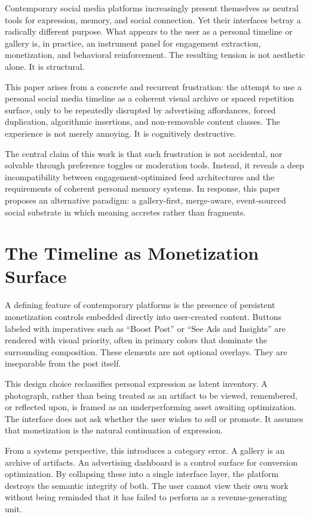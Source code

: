 \documentclass[11pt,oneside]{article}
\begin{document}
Contemporary social media platforms increasingly present themselves as neutral tools for expression, memory, and social connection. Yet their interfaces betray a radically different purpose. What appears to the user as a personal timeline or gallery is, in practice, an instrument panel for engagement extraction, monetization, and behavioral reinforcement. The resulting tension is not aesthetic alone. It is structural.

This paper arises from a concrete and recurrent frustration: the attempt to use a personal social media timeline as a coherent visual archive or spaced repetition surface, only to be repeatedly disrupted by advertising affordances, forced duplication, algorithmic insertions, and non-removable content classes. The experience is not merely annoying. It is cognitively destructive.

The central claim of this work is that such frustration is not accidental, nor solvable through preference toggles or moderation tools. Instead, it reveals a deep incompatibility between engagement-optimized feed architectures and the requirements of coherent personal memory systems. In response, this paper proposes an alternative paradigm: a gallery-first, merge-aware, event-sourced social substrate in which meaning accretes rather than fragments.

\section{The Timeline as Monetization Surface}

A defining feature of contemporary platforms is the presence of persistent monetization controls embedded directly into user-created content. Buttons labeled with imperatives such as “Boost Post” or “See Ads and Insights” are rendered with visual priority, often in primary colors that dominate the surrounding composition. These elements are not optional overlays. They are inseparable from the post itself.

This design choice reclassifies personal expression as latent inventory. A photograph, rather than being treated as an artifact to be viewed, remembered, or reflected upon, is framed as an underperforming asset awaiting optimization. The interface does not ask whether the user wishes to sell or promote. It assumes that monetization is the natural continuation of expression.

From a systems perspective, this introduces a category error. A gallery is an archive of artifacts. An advertising dashboard is a control surface for conversion optimization. By collapsing these into a single interface layer, the platform destroys the semantic integrity of both. The user cannot view their own work without being reminded that it has failed to perform as a revenue-generating unit.
\end{document}

